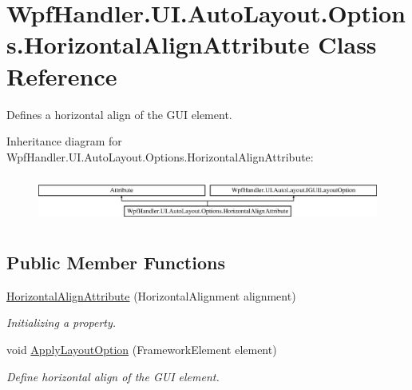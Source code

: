 \hypertarget{class_wpf_handler_1_1_u_i_1_1_auto_layout_1_1_options_1_1_horizontal_align_attribute}{}\section{Wpf\+Handler.\+U\+I.\+Auto\+Layout.\+Options.\+Horizontal\+Align\+Attribute Class Reference}
\label{class_wpf_handler_1_1_u_i_1_1_auto_layout_1_1_options_1_1_horizontal_align_attribute}


Defines a horizontal align of the G\+UI element.  


Inheritance diagram for Wpf\+Handler.\+U\+I.\+Auto\+Layout.\+Options.\+Horizontal\+Align\+Attribute\+:\begin{figure}[H]
\begin{center}
\leavevmode
\includegraphics[height=1.581921cm]{da/de4/class_wpf_handler_1_1_u_i_1_1_auto_layout_1_1_options_1_1_horizontal_align_attribute}
\end{center}
\end{figure}
\subsection*{Public Member Functions}
\begin{DoxyCompactItemize}
\item 
\mbox{\hyperlink{class_wpf_handler_1_1_u_i_1_1_auto_layout_1_1_options_1_1_horizontal_align_attribute_a68f618bca2478665511748571b254dd0}{Horizontal\+Align\+Attribute}} (Horizontal\+Alignment alignment)
\begin{DoxyCompactList}\small\item\em Initializing a property. \end{DoxyCompactList}\item 
void \mbox{\hyperlink{class_wpf_handler_1_1_u_i_1_1_auto_layout_1_1_options_1_1_horizontal_align_attribute_a53335e3d47b8509f6ce67ad93044a760}{Apply\+Layout\+Option}} (Framework\+Element element)
\begin{DoxyCompactList}\small\item\em Define horizontal align of the G\+UI element. \end{DoxyCompactList}\end{DoxyCompactItemize}
